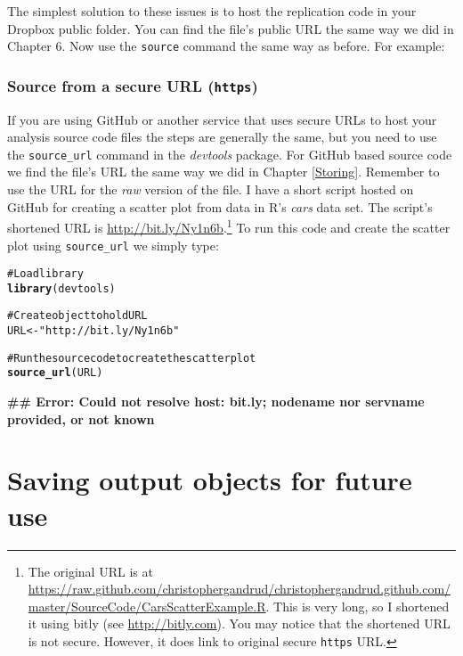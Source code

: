 \documentclass[ChapterTOCs,krantz1]{krantz}\usepackage{graphicx, color}
\makeatletter
\newcommand{\hlfunctioncall}[1]{\textcolor[rgb]{0.501960784313725,0,0.329411764705882}{\textbf{#1}}}%
\newcommand{\hlstring}[1]{\textcolor[rgb]{0.6,0.6,1}{#1}}%
\newcommand{\hlcomment}[1]{\textcolor[rgb]{0.180392156862745,0.6,0.341176470588235}{#1}}%
\newenvironment{kframe}{%
 \def\at@end@of@kframe{}%
 \ifinner\ifhmode%
  \def\at@end@of@kframe{\end{minipage}}%
  \begin{minipage}{\columnwidth}%
 \fi\fi%
 \def\FrameCommand##1{\hskip\@totalleftmargin \hskip-\fboxsep
 \colorbox{shadecolor}{##1}\hskip-\fboxsep
     \hskip-\linewidth \hskip-\@totalleftmargin \hskip\columnwidth}%
 \MakeFramed {\advance\hsize-\width
   \@totalleftmargin\z@ \linewidth\hsize
   \@setminipage}}%
 {\par\unskip\endMakeFramed%
 \at@end@of@kframe}
\newenvironment{knitrout}{}{} %
\makeatother
\begin{document}
The simplest solution to these issues is to host the replication code in your Dropbox public folder. You can find the file's public URL the same way we did in Chapter 6. Now use the \texttt{source} command the same way as before. For example:

\subsubsection{Source from a secure URL (\texttt{https})}

If you are using GitHub or another service that uses secure URLs to host your analysis source code files the steps are generally the same, but you need to use the \texttt{source\_url} command in the {\emph{devtools}} package. For GitHub based source code we find the file's URL the same way we did in Chapter \ref{Storing}. Remember to use the URL for the {\emph{raw}} version of the file. I have a short script hosted on GitHub for creating a scatter plot from data in R's {\emph{cars}} data set. The script's shortened URL is \url{http://bit.ly/Ny1n6b}.\footnote{The original URL is at \url{https://raw.github.com/christophergandrud/christophergandrud.github.com/master/SourceCode/CarsScatterExample.R}. This is very long, so I shortened it using bitly (see \url{http://bitly.com}). You may notice that the shortened URL is not secure. However, it does link to original secure {\tt{https}} URL.} To run this code and create the scatter plot using {\tt{source\_url}} we simply type:

\begin{knitrout}
\color{fgcolor}\begin{kframe}
\begin{alltt}
\hlcomment{# Load library}
\hlfunctioncall{library}(devtools)

\hlcomment{# Create object to hold URL}
URL <- \hlstring{"http://bit.ly/Ny1n6b"}

\hlcomment{# Run the source code to create the scatter plot}
\hlfunctioncall{source_url}(URL)
\end{alltt}


{\ttfamily\noindent\bfseries\textcolor{errorcolor}{\#\# Error: Could not resolve host: bit.ly; nodename nor servname provided, or not known}}\end{kframe}
\end{knitrout}


\section{Saving output objects for future use}
\end{document}
